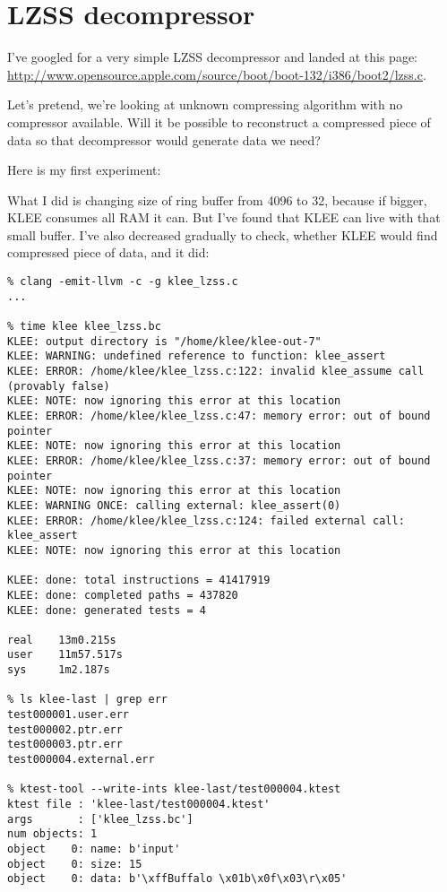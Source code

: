 \section{LZSS decompressor}

I've googled for a very simple \ac{LZSS} decompressor and landed at this page:
\url{http://www.opensource.apple.com/source/boot/boot-132/i386/boot2/lzss.c}.

Let's pretend, we're looking at unknown compressing algorithm with no compressor available.
Will it be possible to reconstruct a compressed piece of data so that decompressor would generate data we need?

Here is my first experiment:



What I did is changing size of ring buffer from 4096 to 32, because if bigger, KLEE consumes all \ac{RAM} it can.
But I've found that KLEE can live with that small buffer.
I've also decreased  gradually to check, whether KLEE would find compressed piece of data, and it did:

\begin{lstlisting}
% clang -emit-llvm -c -g klee_lzss.c
...

% time klee klee_lzss.bc
KLEE: output directory is "/home/klee/klee-out-7"
KLEE: WARNING: undefined reference to function: klee_assert
KLEE: ERROR: /home/klee/klee_lzss.c:122: invalid klee_assume call (provably false)
KLEE: NOTE: now ignoring this error at this location
KLEE: ERROR: /home/klee/klee_lzss.c:47: memory error: out of bound pointer
KLEE: NOTE: now ignoring this error at this location
KLEE: ERROR: /home/klee/klee_lzss.c:37: memory error: out of bound pointer
KLEE: NOTE: now ignoring this error at this location
KLEE: WARNING ONCE: calling external: klee_assert(0)
KLEE: ERROR: /home/klee/klee_lzss.c:124: failed external call: klee_assert
KLEE: NOTE: now ignoring this error at this location

KLEE: done: total instructions = 41417919
KLEE: done: completed paths = 437820
KLEE: done: generated tests = 4

real    13m0.215s
user    11m57.517s
sys     1m2.187s

% ls klee-last | grep err
test000001.user.err
test000002.ptr.err
test000003.ptr.err
test000004.external.err

% ktest-tool --write-ints klee-last/test000004.ktest
ktest file : 'klee-last/test000004.ktest'
args       : ['klee_lzss.bc']
num objects: 1
object    0: name: b'input'
object    0: size: 15
object    0: data: b'\xffBuffalo \x01b\x0f\x03\r\x05'
\end{lstlisting}

